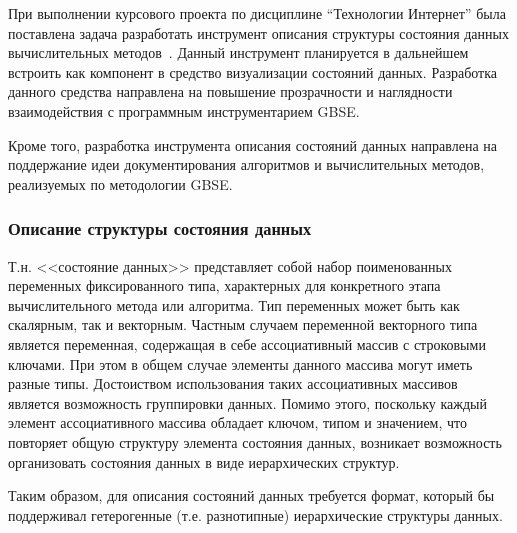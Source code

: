 \def\notedate{2022.05.17}
\def\currentauthor{Тришин И.В.}

При выполнении курсового проекта по дисциплине ``Технологии Интернет'' была поставлена задача разработать инструмент описания структуры состояния данных вычислительных методов~\cite{SokolovPershin2018}. Данный инструмент планируется в дальнейшем встроить как компонент в средство визуализации состояний данных. Разработка данного средства направлена на повышение прозрачности и наглядности взаимодействия с программным инструментарием GBSE.

Кроме того, разработка инструмента описания состояний данных направлена на поддержание идеи документирования алгоритмов и вычислительных методов, реализуемых по методологии GBSE.

\subsubsection{Описание структуры состояния данных}

Т.н. <<состояние данных>> представляет собой набор поименованных переменных фиксированного типа, характерных для конкретного этапа вычислительного метода или алгоритма. Тип переменных может быть как скалярным, так и векторным. Частным случаем переменной векторного типа является переменная, содержащая в себе ассоциативный массив с строковыми ключами. При этом в общем случае элементы данного массива могут иметь разные типы. Достоиством использования таких ассоциативных массивов является возможность группировки данных. Помимо этого, поскольку каждый элемент ассоциативного массива обладает ключом, типом и значением, что повторяет общую структуру элемента состояния данных, возникает возможность организовать состояния данных в виде иерархических структур.

Таким образом, для описания состояний данных требуется формат, который бы поддерживал гетерогенные (т.е. разнотипные) иерархические структуры данных.